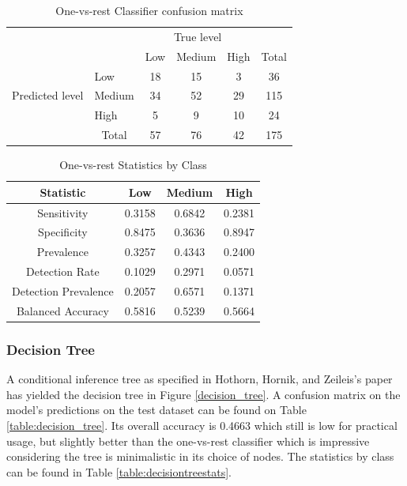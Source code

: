 \documentclass[12pt, a4paper]{article}
\begin{document}
\begin{table}[ht]
\centering
\begin{tabular}{l|l|c|c|c|c}
\multicolumn{2}{c}{}&\multicolumn{3}{c}{True level}&\\
\cline{3-5}
\multicolumn{2}{c|}{}&Low&Medium&High&\multicolumn{1}{c}{Total}\\
\cline{2-5}
\multirow{3}{*}{Predicted level}& Low & 18 & 15 & 3 & 36\\
\cline{2-5}
& Medium & 34 & 52 & 29 & 115\\
\cline{2-5}
& High & 5 & 9 & 10 & 24\\
\cline{2-5}
\multicolumn{1}{c}{} & \multicolumn{1}{c}{Total} & \multicolumn{1}{c}{57} & \multicolumn{    1}{c}{76} & \multicolumn{    1}{c}{42} & \multicolumn{1}{c}{175}\\
\end{tabular}
\caption{One-vs-rest Classifier confusion matrix}
\label{table:onevall}
\end{table}

\begin{table}[ht]
\centering
\begin{tabular}{||c c c c||} 
 \hline
 Statistic & Low & Medium & High \\ [0.5ex] 
 \hline\hline
 Sensitivity & 0.3158 & 0.6842 & 0.2381 \\ 
 Specificity & 0.8475 & 0.3636 & 0.8947 \\
 Prevalence & 0.3257 & 0.4343 & 0.2400 \\
 Detection Rate & 0.1029 & 0.2971 & 0.0571 \\
 Detection Prevalence  & 0.2057 & 0.6571 & 0.1371 \\ 
 Balanced Accuracy  & 0.5816 & 0.5239 & 0.5664 \\ [1ex] 
 \hline
\end{tabular}
\caption{One-vs-rest Statistics by Class}
\label{table:onevallstats}
\end{table}

\subsubsection{Decision Tree}

A conditional inference tree as specified in Hothorn, Hornik, and Zeileis's paper \cite{ctree} has yielded the decision tree in Figure \ref{decision_tree}. A confusion matrix on the model's predictions on the test dataset can be found on Table \ref{table:decision_tree}. Its overall accuracy is 0.4663 which still is low for practical usage, but slightly better than the one-vs-rest classifier which is impressive considering the tree is minimalistic in its choice of nodes. The statistics by class can be found in Table \ref{table:decisiontreestats}. 
\end{document}
